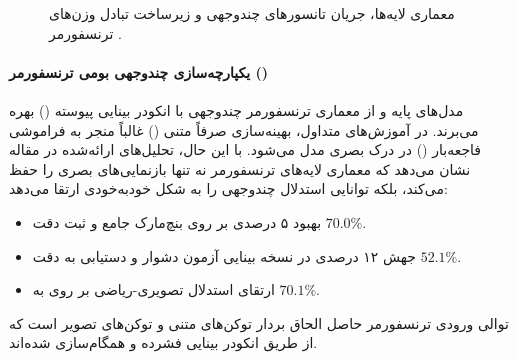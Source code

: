 \begin{figure}[htbp]
{%
}
\caption{معماری لایه‌ها، جریان تانسورهای چندوجهی و زیرساخت تبادل وزن‌های ترنسفورمر .}
\label{fig:magistral_transformer_architecture}
\end{figure}

\paragraph*{یکپارچه‌سازی چندوجهی بومی ترنسفورمر ()}
مدل‌های پایه  و  از معماری ترنسفورمر چندوجهی با انکودر بینایی پیوسته () بهره می‌برند. در آموزش‌های متداول، بهینه‌سازی صرفاً متنی () غالباً منجر به فراموشی فاجعه‌بار () در درک بصری مدل می‌شود. با این حال، تحلیل‌های ارائه‌شده در مقاله نشان می‌دهد که معماری لایه‌های ترنسفورمر نه تنها بازنمایی‌های بصری را حفظ می‌کند، بلکه توانایی استدلال چندوجهی را به شکل خودبه‌خودی ارتقا می‌دهد:
\begin{itemize}
    \item بهبود ۵ درصدی بر روی بنچ‌مارک جامع  \cite{yue2024mmmu} و ثبت دقت $70.0\%$.
    \item جهش ۱۲ درصدی در نسخه بینایی آزمون دشوار  \cite{yue2025mmmupro} و دستیابی به دقت $52.1\%$.
    \item ارتقای استدلال تصویری-ریاضی بر روی  \cite{lu2024mathvista} به $70.1\%$.
\end{itemize}
توالی ورودی ترنسفورمر حاصل الحاق بردار توکن‌های متنی و توکن‌های تصویر است که از طریق انکودر بینایی فشرده و همگام‌سازی شده‌اند.

